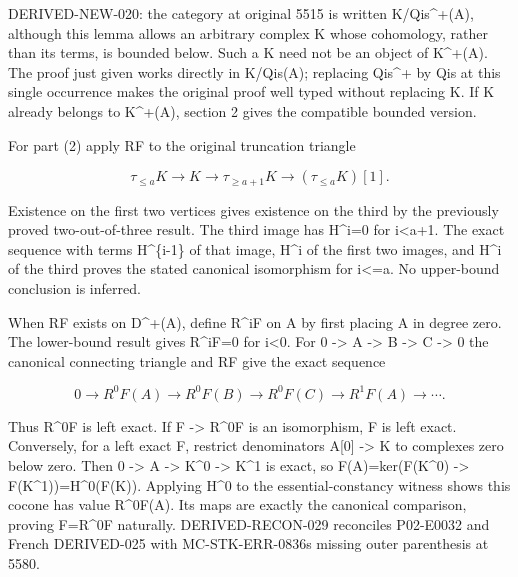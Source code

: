 \documentclass[11pt]{article}
\begin{document}
DERIVED-NEW-020:\allowbreak{} the category at original 5515 is written K/\allowbreak{}Qis\textasciicircum{}\allowbreak{}+(A)\allowbreak{},\allowbreak{} although this lemma allows an arbitrary complex K whose cohomology,\allowbreak{} rather than its terms,\allowbreak{} is bounded below. Such a K need not be an object of K\textasciicircum{}\allowbreak{}+(A)\allowbreak{}. The proof just given works directly in K/\allowbreak{}Qis(A)\allowbreak{}; replacing Qis\textasciicircum{}\allowbreak{}+ by Qis at this single occurrence makes the original proof well typed without replacing K. If K already belongs to K\textasciicircum{}\allowbreak{}+(A)\allowbreak{},\allowbreak{} section 2 gives the compatible bounded version.

For part (2)\allowbreak{} apply RF to the original truncation triangle

\[
 \tau_{\le a}K\longrightarrow K\longrightarrow\tau_{\ge a+1}K
                      \longrightarrow(\tau_{\le a}K)[1].       \tag{4.1}
\]

Existence on the first two vertices gives existence on the third by the previously proved two-out-of-three result. The third image has H\textasciicircum{}i\allowbreak{}=0 for i<a\allowbreak{}+1. The exact sequence with terms H\^{}\{i-1\} of that image,\allowbreak{} H\^{}i of the first two images,\allowbreak{} and H\^{}i of the third proves the stated canonical isomorphism for i<\allowbreak{}=a. No upper-bound conclusion is inferred.

When RF exists on D\textasciicircum{}\allowbreak{}+(A)\allowbreak{},\allowbreak{} define R\^{}iF on A by first placing A in degree zero. The lower-bound result gives R\textasciicircum{}iF\allowbreak{}=0 for i\textless0. For 0 \allowbreak{}-> A \allowbreak{}-> B \allowbreak{}-> C \allowbreak{}-> 0 the canonical connecting triangle and RF give the exact sequence

\[
 0\to R^0F(A)\to R^0F(B)\to R^0F(C)\to R^1F(A)\to\cdots.
\]

Thus R\^{}0F is left exact. If F \allowbreak{}-> R\^{}0F is an isomorphism,\allowbreak{} F is left exact. Conversely,\allowbreak{} for a left exact F,\allowbreak{} restrict denominators A[0]\allowbreak{} \allowbreak{}-> K to complexes zero below zero. Then 0 \allowbreak{}-> A \allowbreak{}-> K\^{}0 \allowbreak{}-> K\^{}1 is exact,\allowbreak{} so F(A)\allowbreak{}\allowbreak{}=ker(F(K\textasciicircum{}0)\allowbreak{} \allowbreak{}-> F(K\textasciicircum{}1)\allowbreak{})\allowbreak{}\allowbreak{}=H\textasciicircum{}0(F(K)\allowbreak{})\allowbreak{}. Applying H\^{}0 to the essential-constancy witness shows this cocone has value R\textasciicircum{}0F(A)\allowbreak{}. Its maps are exactly the canonical comparison,\allowbreak{} proving F\allowbreak{}=R\textasciicircum{}0F naturally. DERIVED-RECON-029 reconciles P02-E0032 and French DERIVED-025 with MC-STK-ERR-0836\textquotesingle s missing outer parenthesis at 5580.
\end{document}
